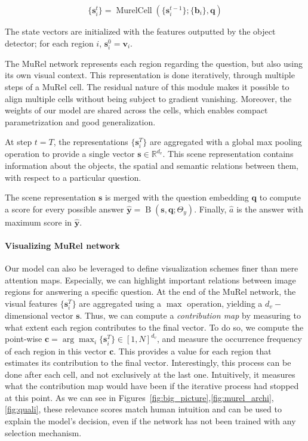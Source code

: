 \documentclass[10pt,twocolumn,letterpaper]{article}
\DeclareMathOperator*{\fusion}{B}
\DeclareMathOperator*{\murelcell}{MurelCell}
\begin{document}
\begin{equation}
\label{eq:iteration}
    \{\bm{s}_i^{t}\} = \murelcell \left( \{\bm{s}_i^{t-1}\}; \{\bm{b}_i\}, \bm{q} \right)
\end{equation}

The state vectors are initialized with the features outputted by the object detector; for each region $i$,  $\bm{s}_i^0 = \bm{v}_i$. 

The MuRel network represents each region regarding the question, but also using its own visual context. This representation is done iteratively, through multiple steps of a MuRel cell. 
The residual nature of this module makes it possible to align multiple cells without being subject to gradient vanishing. 
Moreover, the weights of our model are shared across the cells, which enables compact parametrization and good generalization.

At step $t=T$, the representations $\{ \bm{s}_i^T \}$ are aggregated with a global max pooling operation to provide a single vector $\bm{s} \in \mathbb{R}^{d_v}$. This scene representation contains information about the objects, the spatial and semantic relations between them, with respect to a particular question.

The scene representation $\bm{s}$ is merged with the question embedding $\bm{q}$ to compute a score for every possible answer $\hat{\bm{y}} = \fusion \left( \bm{s}, \bm{q}; \Theta_{y} \right)$. Finally, $\hat{a}$ is the answer with maximum score in $\hat{\bm{y}}$.


\paragraph{Visualizing MuRel network}
Our model can also be leveraged to define visualization schemes finer than mere attention maps. 
Especially, we can highlight important relations between image regions for answering a specific question.
At the end of the MuRel network, the visual features $\{\bm{s}_i^T\}$ are aggregated using a $\max$ operation, yielding a $d_v-$dimensional vector $\bm{s}$. 
Thus, we can compute a \textit{contribution map} by measuring to what extent each region contributes to the final vector. 
To do so, we compute the point-wise $\bm{c} = \arg\!\max_i  \{\bm{s}_i^T\}  \in [1, N]^{d_v}$, and measure the occurrence frequency of each region in this vector $\bm{c}$. This provides a value for each region that estimates its contribution to the final vector.
Interestingly, this process can be done after each cell, and not exclusively at the last one. Intuitively, it measures what the contribution map would have been if the iterative process had stopped at this point.
As we can see in Figures~\ref{fig:big_picture},\ref{fig:murel_archi},\ref{fig:quali}, these relevance scores match human intuition and can be used to explain the model's decision, even if the network has not been trained with any selection mechanism.
\end{document}
